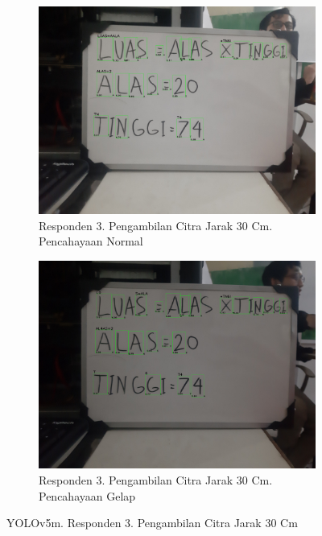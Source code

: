 \begin{figure}[H]
  \begin{subfigure}{.5\textwidth}
    \centering
    \captionsetup{width=.8\linewidth}
    \includegraphics[width=.8\linewidth]{gambar/yolov5m/responden3/hans30cm00-result.jpg}
    \caption{Responden 3. Pengambilan Citra Jarak 30 Cm. Pencahayaan Normal}
    \label{fig:mr3tcitra30cm}
  \end{subfigure}%
  \begin{subfigure}{.5\textwidth}
    \centering
    \captionsetup{width=.8\linewidth}
    \includegraphics[width=.8\linewidth]{gambar/yolov5m/responden3/hans30cm10-result.jpg}
    \caption{Responden 3. Pengambilan Citra Jarak 30 Cm. Pencahayaan Gelap}
    \label{fig:mr3gcitra30cm}
  \end{subfigure}
  \caption{YOLOv5m. Responden 3. Pengambilan Citra Jarak 30 Cm}
  \label{fig:mr3citra30cm}
\end{figure}

